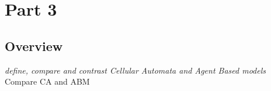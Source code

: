 \documentclass[11pt]{article} %
\begin{document}









\section{Part 3}

\subsection{Overview}

\textit{define, compare and contrast Cellular Automata and Agent Based models}
Compare CA and ABM
\end{document}
